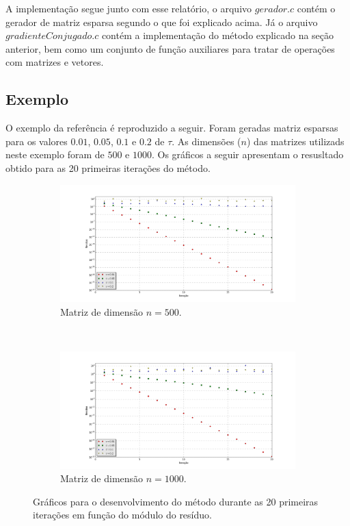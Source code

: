\documentclass [a4paper,10pt]{article}
\begin{document}
{    A implementação segue junto com esse relatório, o arquivo $gerador.c$ contém o gerador de matriz esparsa segundo o que foi
    explicado acima. Já o arquivo $gradienteConjugado.c$ contém a implementação do método explicado na seção anterior, bem como
    um conjunto de função auxiliares para tratar de operações com matrizes e vetores.

    \subsection{Exemplo}
    O exemplo da referência \cite{livro1} é reproduzido a seguir. Foram geradas matriz esparsas para os valores $0.01$,
    $0.05$, $0.1$ e $0.2$ de $\tau$. As dimensões ($n$) das matrizes utilizads neste exemplo foram de $500$ e $1000$.
    Os gráficos a seguir apresentam o resusltado obtido para as 20 primeiras iterações do método.
    \begin{figure}[!ht]
        \centering
        \begin{subfigure}[!hb]{\textwidth}
            \centering
            \includegraphics[scale=0.23]{figure_500.png}
            \caption{Matriz de dimensão $n = 500$.}
        \end{subfigure}
        \\
        \begin{subfigure}[!hb]{\textwidth}
            \centering
            \includegraphics[scale=0.23]{figure_1000.png}
            \caption{Matriz de dimensão $n = 1000$.}
        \end{subfigure}
        \caption{Gráficos para o desenvolvimento do método durante as 20 primeiras iterações
        em função do módulo do resíduo.}
    \end{figure}

}
\end{document}
